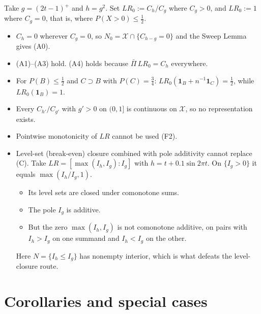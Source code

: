 \begin{example}[(A5)]
Take $g=(2t-1)^+$ and $h=g^2$. Set $LR_0:=C_h/C_g$ where $C_g>0$, and $LR_0:=1$ where $C_g=0$, that is, where $P(X>0)\le\frac12$.
\begin{itemize}
\item $C_h=0$ wherever $C_g=0$, so $N_0=\mathcal X\cap\{C_{h-g}=0\}$ and the Sweep Lemma gives (A0).
\item (A1)--(A3) hold. (A4) holds because $\bar\Pi\,LR_0=C_h$ everywhere.
\item For $P(B)\le\frac12$ and $C\supset B$ with $P(C)=\frac34$: $LR_0(\mathbf 1_B+n^{-1}\mathbf 1_C)=\tfrac12$, while $LR_0(\mathbf 1_B)=1$.
\item Every $C_{h'}/C_{g'}$ with $g'>0$ on $(0,1]$ is continuous on $\mathcal X$, so no representation exists.
\end{itemize}
\end{example}

\begin{remark}
\begin{itemize}
\item Pointwise monotonicity of $LR$ cannot be used (F2).
\item Level-set (break-even) closure combined with pole additivity cannot replace (C). Take $LR=[\max(I_h,I_g):I_g]$ with $h=t+0.1\sin2\pi t$. On $\{I_g>0\}$ it equals $\max(I_h/I_g,1)$.
  \begin{itemize}
  \item Its level sets are closed under comonotone sums.
  \item The pole $I_g$ is additive.
  \item But the zero $\max(I_h,I_g)$ is not comonotone additive, on pairs with $I_h>I_g$ on one summand and $I_h<I_g$ on the other.
  \end{itemize}
  Here $N=\{I_h\le I_g\}$ has nonempty interior, which is what defeats the level-closure route.
\end{itemize}
\end{remark}

\section{Corollaries and special cases}

